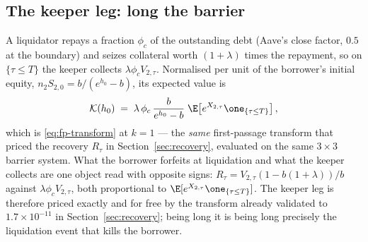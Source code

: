 \subsection{The keeper leg: long the barrier}\label{sec:barbell-keeper}
A liquidator repays a fraction $\phi_c$ of the outstanding debt (Aave's close factor, $0.5$ at the
boundary) and seizes collateral worth $(1+\lambda)$ times the repayment, so on $\{\tau\le T\}$ the
keeper collects $\lambda\phi_c V_{2,\tau}$. Normalised per unit of the borrower's initial equity,
$n_2 S_{2,0}=b/(e^{h_0}-b)$, its expected value is
\begin{equation}\label{eq:keeper}
\mathcal K(h_0)\;=\;\lambda\,\phi_c\,\frac{b}{e^{h_0}-b}\;\E\!\left[e^{X_{2,\tau}}\one_{\{\tau\le T\}}\right],
\end{equation}
which is \eqref{eq:fp-transform} at $k=1$ --- the \emph{same} first-passage transform that priced the
recovery $R_\tau$ in Section~\ref{sec:recovery}, evaluated on the same $3\times3$ barrier system.
What the borrower forfeits at liquidation and what the keeper collects are one object read with
opposite signs: $R_\tau=V_{2,\tau}(1-b(1+\lambda))/b$ against $\lambda\phi_c V_{2,\tau}$, both
proportional to $\E[e^{X_{2,\tau}}\one_{\{\tau\le T\}}]$. The keeper leg is therefore priced exactly
and for free by the transform already validated to $1.7\times10^{-11}$ in
Section~\ref{sec:recovery}; being long it is being long precisely the liquidation event that kills
the borrower.

